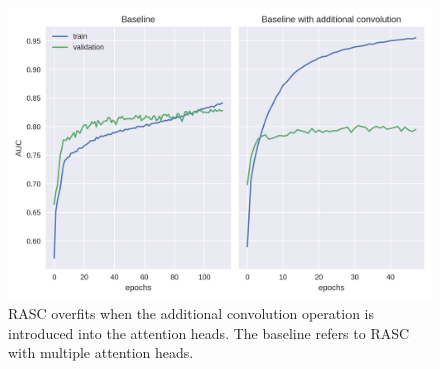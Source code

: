 \begin{figure}
	\centering\includegraphics[width=1\textwidth]{../visualizations/ch5-results/training_curve_conv_heads2.png} 
	\caption{RASC overfits when the additional convolution operation is introduced into the attention heads. The baseline refers to RASC with multiple attention heads. }
	\label{fig:training_curve}
\end{figure}


